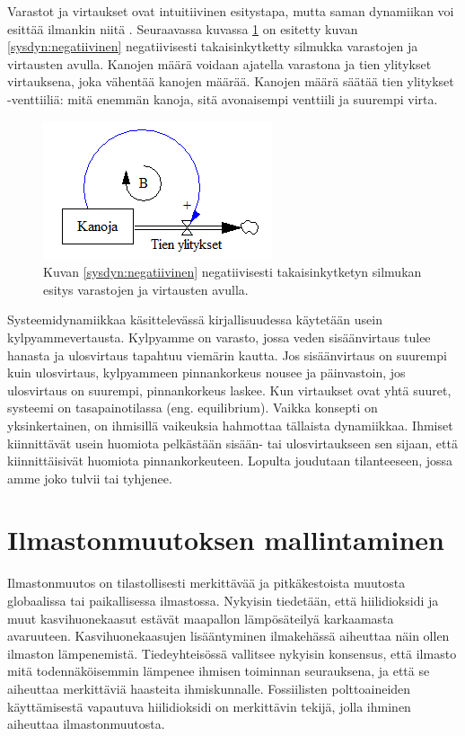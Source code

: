 \documentclass[finnish,12pt,a4paper,pdftex]{article}
\begin{document}
\begin{onehalfspacing}
Varastot ja virtaukset ovat intuitiivinen esitystapa, mutta saman dynamiikan voi esittää ilmankin niitä \cite[s. 191--230]{Sterman2000}. Seuraavassa kuvassa \ref{sysdyn:varastovirtauskana} on esitetty kuvan \ref{sysdyn:negatiivinen} negatiivisesti takaisinkytketty silmukka varastojen ja virtausten avulla. Kanojen määrä voidaan ajatella varastona ja tien ylitykset virtauksena, joka vähentää kanojen määrää. Kanojen määrä säätää tien ylitykset -venttiiliä: mitä enemmän kanoja, sitä avonaisempi venttiili ja suurempi virta. 

\begin{figure}[H]
\centering \includegraphics{varastovirtauskana}
\caption{Kuvan \ref{sysdyn:negatiivinen} negatiivisesti takaisinkytketyn silmukan esitys varastojen ja virtausten avulla. \label{sysdyn:varastovirtauskana}}
\end{figure}

Systeemidynamiikkaa käsittelevässä kirjallisuudessa käytetään usein kylpyammevertausta. Kylpyamme on varasto, jossa veden sisäänvirtaus tulee hanasta ja ulosvirtaus tapahtuu viemärin kautta. Jos sisäänvirtaus on suurempi kuin ulosvirtaus, kylpyammeen pinnankorkeus nousee ja päinvastoin, jos ulosvirtaus on suurempi, pinnankorkeus laskee. Kun virtaukset ovat yhtä suuret, systeemi on tasapainotilassa (eng. equilibrium). Vaikka konsepti on yksinkertainen, on ihmisillä vaikeuksia hahmottaa tällaista dynamiikkaa. Ihmiset kiinnittävät usein huomiota pelkästään sisään- tai ulosvirtaukseen sen sijaan, että kiinnittäisivät huomiota pinnankorkeuteen. Lopulta joudutaan tilanteeseen, jossa amme joko tulvii tai tyhjenee. \cite{Sweeney2000}

\clearpage
\section{Ilmastonmuutoksen mallintaminen \label{ilmasto}}

Ilmastonmuutos on tilastollisesti merkittävää ja pitkäkestoista muutosta globaalissa tai paikallisessa ilmastossa. Nykyisin tiedetään, että hiilidioksidi ja muut kasvihuonekaasut estävät maapallon lämpösäteilyä karkaamasta avaruuteen. Kasvihuonekaasujen lisääntyminen ilmakehässä aiheuttaa näin ollen ilmaston lämpenemistä. Tiedeyhteisössä vallitsee nykyisin konsensus, että ilmasto mitä todennäköisemmin lämpenee ihmisen toiminnan seurauksena, ja että se aiheuttaa merkittäviä haasteita ihmiskunnalle. Fossiilisten polttoaineiden käyttämisestä vapautuva hiilidioksidi on merkittävin tekijä, jolla ihminen aiheuttaa ilmastonmuutosta. \cite{AmericanInstituteofPhysics} 


\end{onehalfspacing}
\end{document}
